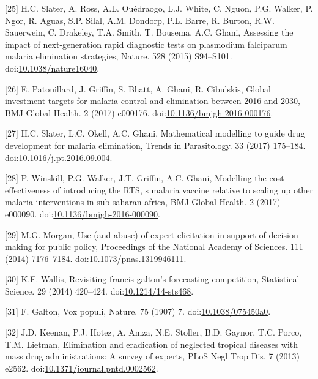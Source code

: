 \documentclass[]{article}
\begin{document}
\hypertarget{ref-Slater2015}{}
{[}25{]} H.C. Slater, A. Ross, A.L. Ouédraogo, L.J. White, C. Nguon,
P.G. Walker, P. Ngor, R. Aguas, S.P. Silal, A.M. Dondorp, P.L. Barre, R.
Burton, R.W. Sauerwein, C. Drakeley, T.A. Smith, T. Bousema, A.C. Ghani,
Assessing the impact of next-generation rapid diagnostic tests on
plasmodium falciparum malaria elimination strategies, Nature. 528 (2015)
S94--S101.
doi:\href{https://doi.org/10.1038/nature16040}{10.1038/nature16040}.

\hypertarget{ref-Patouillard2017}{}
{[}26{]} E. Patouillard, J. Griffin, S. Bhatt, A. Ghani, R. Cibulskis,
Global investment targets for malaria control and elimination between
2016 and 2030, BMJ Global Health. 2 (2017) e000176.
doi:\href{https://doi.org/10.1136/bmjgh-2016-000176}{10.1136/bmjgh-2016-000176}.

\hypertarget{ref-Slater2017}{}
{[}27{]} H.C. Slater, L.C. Okell, A.C. Ghani, Mathematical modelling to
guide drug development for malaria elimination, Trends in Parasitology.
33 (2017) 175--184.
doi:\href{https://doi.org/10.1016/j.pt.2016.09.004}{10.1016/j.pt.2016.09.004}.

\hypertarget{ref-Winskill2017}{}
{[}28{]} P. Winskill, P.G. Walker, J.T. Griffin, A.C. Ghani, Modelling
the cost-effectiveness of introducing the RTS, s malaria vaccine
relative to scaling up other malaria interventions in sub-saharan
africa, BMJ Global Health. 2 (2017) e000090.
doi:\href{https://doi.org/10.1136/bmjgh-2016-000090}{10.1136/bmjgh-2016-000090}.

\hypertarget{ref-Morgan_2014}{}
{[}29{]} M.G. Morgan, Use (and abuse) of expert elicitation in support
of decision making for public policy, Proceedings of the National
Academy of Sciences. 111 (2014) 7176--7184.
doi:\href{https://doi.org/10.1073/pnas.1319946111}{10.1073/pnas.1319946111}.

\hypertarget{ref-Wallis2014}{}
{[}30{]} K.F. Wallis, Revisiting francis galton's forecasting
competition, Statistical Science. 29 (2014) 420--424.
doi:\href{https://doi.org/10.1214/14-sts468}{10.1214/14-sts468}.

\hypertarget{ref-Galton1907Voxpopuli}{}
{[}31{]} F. Galton, Vox populi, Nature. 75 (1907) 7.
doi:\href{https://doi.org/10.1038/075450a0}{10.1038/075450a0}.

\hypertarget{ref-Keenan2013}{}
{[}32{]} J.D. Keenan, P.J. Hotez, A. Amza, N.E. Stoller, B.D. Gaynor,
T.C. Porco, T.M. Lietman, Elimination and eradication of neglected
tropical diseases with mass drug administrations: A survey of experts,
PLoS Negl Trop Dis. 7 (2013) e2562.
doi:\href{https://doi.org/10.1371/journal.pntd.0002562}{10.1371/journal.pntd.0002562}.
\end{document}
